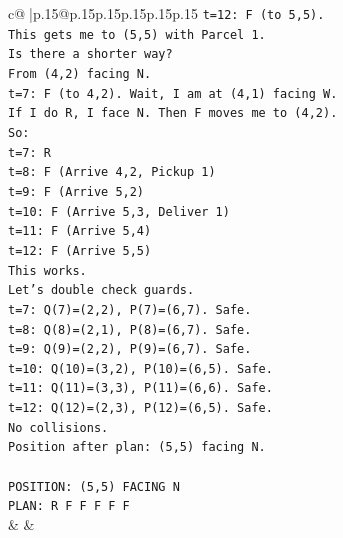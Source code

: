 \documentclass{article}
\begin{document}
{\begin{supertabular}{c@{$\;$}|p{.15\linewidth}@{}p{.15\linewidth}p{.15\linewidth}p{.15\linewidth}p{.15\linewidth}p{.15\linewidth}}
{{{\texttt{t=12: F (to 5,5).} \\
\texttt{This gets me to (5,5) with Parcel 1.} \\
\texttt{Is there a shorter way?} \\
\texttt{From (4,2) facing N.} \\
\texttt{t=7: F (to 4,2). Wait, I am at (4,1) facing W.} \\
\texttt{If I do R, I face N. Then F moves me to (4,2).} \\
\texttt{So:} \\
\texttt{t=7: R} \\
\texttt{t=8: F (Arrive 4,2, Pickup 1)} \\
\texttt{t=9: F (Arrive 5,2)} \\
\texttt{t=10: F (Arrive 5,3, Deliver 1)} \\
\texttt{t=11: F (Arrive 5,4)} \\
\texttt{t=12: F (Arrive 5,5)} \\
\texttt{This works.} \\
\texttt{Let's double check guards.} \\
\texttt{t=7: Q(7)=(2,2), P(7)=(6,7). Safe.} \\
\texttt{t=8: Q(8)=(2,1), P(8)=(6,7). Safe.} \\
\texttt{t=9: Q(9)=(2,2), P(9)=(6,7). Safe.} \\
\texttt{t=10: Q(10)=(3,2), P(10)=(6,5). Safe.} \\
\texttt{t=11: Q(11)=(3,3), P(11)=(6,6). Safe.} \\
\texttt{t=12: Q(12)=(2,3), P(12)=(6,5). Safe.} \\
\texttt{No collisions.} \\
\texttt{Position after plan: (5,5) facing N.} \\
\\ 
\texttt{POSITION: (5,5) FACING N} \\
\texttt{PLAN: R F F F F F} \\
            }
        }
    }
    & & \\ \\


\end{supertabular}}
\end{document}
